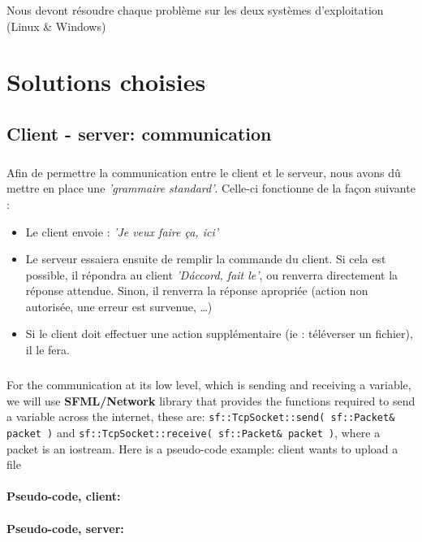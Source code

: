 \documentclass[12pt,a4paper,twoside]{article}
\begin{document}
			Nous devont résoudre chaque problème sur les deux systèmes d'exploitation (Linux \& Windows)
	\section{Solutions choisies} %
		\subsection{Client - server: communication} %
			\subparagraph*{}
				Afin de permettre la communication entre le client et le serveur, nous avons dû mettre en place une \textit{'grammaire standard'}. Celle-ci fonctionne de la façon suivante :
				\begin{itemize}
					\item{} Le client envoie : \textit{'Je veux faire ça, ici'}
					\item{} Le serveur essaiera ensuite de remplir la commande du client. Si cela est possible, il répondra au client \textit{'D\'accord, fait le'}, ou renverra directement la réponse attendue. Sinon, il renverra la réponse apropriée (action non autorisée, une erreur est survenue, \ldots{})
					\item{} Si le client doit effectuer une action supplémentaire (ie : téléverser un fichier), il le fera.
				\end{itemize}
			\subparagraph*{}
				For the communication at its low level, which is sending and receiving a variable, we will use \textbf{SFML/Network} library that provides the functions required to send a variable across the internet, these are: \lstinline$sf::TcpSocket::send( sf::Packet& packet )$ and \lstinline$sf::TcpSocket::receive( sf::Packet& packet )$, where a packet is an iostream.
				Here is a pseudo-code example: client wants to upload a file
			\paragraph*{Pseudo-code, client:}
				
			\paragraph*{Pseudo-code, server:}
				
				
\end{document}
